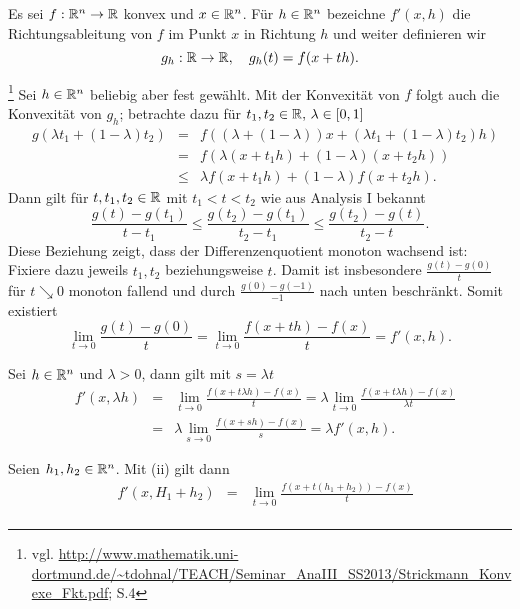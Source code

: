 Es sei $f:\mathbb{R}^n\to \mathbb{R}$ konvex und $x\in \mathbb{R}^n$. Für $h\in \mathbb{R}^n$ bezeichne $f'(x,h)$ die Richtungsableitung von $f$ im Punkt $x$ in Richtung $h$ und
weiter definieren wir 
\begin{displaymath}
 g_h:\mathbb{R}\to\mathbb{R},\quad g_h(t)=f(x+th).
\end{displaymath}

\begin{compactenum}[(i)]
 \item \footnote{vgl. \url{http://www.mathematik.uni-dortmund.de/~tdohnal/TEACH/Seminar\_AnaIII\_SS2013/Strickmann\_Konvexe\_Fkt.pdf}; S.4}
 Sei $h\in\mathbb{R}^n$ beliebig aber fest gewählt. Mit der Konvexität von $f$ folgt auch die Konvexität von $g_h$;
 betrachte dazu für $t_1,t_2\in \mathbb{R}, \, \lambda\in[0,1]$
 \begin{align*}
  &g(\lambda t_1+(1-\lambda)t_2)&=& f((\lambda+(1-\lambda))x+(\lambda t_1+(1-\lambda)t_2)h)\\
  &&=& f(\lambda(x+t_1h)+(1-\lambda)(x+t_2h))\\
  &&\leq& \lambda f(x+t_1h)+(1-\lambda)f(x+t_2h).
 \end{align*}
 Dann gilt für $t,t_1,t_2\in \mathbb{R}$ mit $t_1<t<t_2$ wie aus Analysis I bekannt
 \begin{displaymath}
  \frac{g(t)-g(t_1)}{t-t_1}\leq\frac{g(t_2)-g(t_1)}{t_2-t_1}\leq\frac{g(t_2)-g(t)}{t_2-t}.
 \end{displaymath}
 Diese Beziehung zeigt, dass der Differenzenquotient monoton wachsend ist: Fixiere dazu jeweils $t_1,t_2$ beziehungsweise $t$.
 Damit ist insbesondere $\frac{g(t)-g(0)}{t}$ für $t\searrow0$ monoton fallend und durch $\frac{g(0)-g(-1)}{-1}$ nach unten beschränkt.
 Somit existiert 
 \begin{displaymath}
  \lim_{t\to 0} \frac{g(t)-g(0)}{t}=\lim_{t\to 0}\frac{f(x+th)-f(x)}{t}=f'(x,h).
 \end{displaymath}
 \item Sei $h\in\mathbb{R}^n$ und $\lambda>0$, dann gilt mit $s=\lambda t$
 \begin{align*}
  &f'(x,\lambda h)&=&\lim_{t\to 0}\frac{f(x+t\lambda h)-f(x)}{t}=\lambda\lim_{t\to 0}\frac{f(x+t\lambda h)-f(x)}{\lambda t}\\
  &&=&\lambda\lim_{s\to 0}\frac{f(x+s h)-f(x)}{s}=\lambda f'(x,h).
 \end{align*}
 \item Seien $h_1, h_2\in\mathbb{R}^n$. Mit (ii) gilt dann
 \begin{align*}
  &f'(x,H_1+h_2)&=&\lim_{t\to 0} \frac{f(x+t(h_1+h_2))-f(x)}{t}\\

\end{align*}
\end{compactenum}
